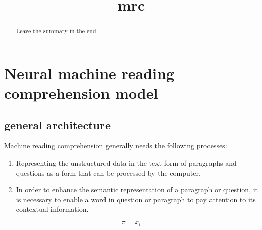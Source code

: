 \documentclass{article}
\title{mrc}
\date{}
\begin{document}
    \maketitle %
	\begin{abstract}
		Leave the summary in the end
	\end{abstract}





\section{Neural machine reading comprehension model}
\subsection{general architecture}
Machine reading comprehension generally needs the following processes:

\begin{enumerate}
	\item Representing the unstructured data in the text form of paragraphs and questions as a form that can be processed by the computer.
	\item In order to enhance the semantic representation of a paragraph or question, it is necessary to enable a word in question or paragraph to pay attention to its contextual information.
\end{enumerate}

\begin{equation}
	\pi=x_i
\end{equation}
\end{document}
